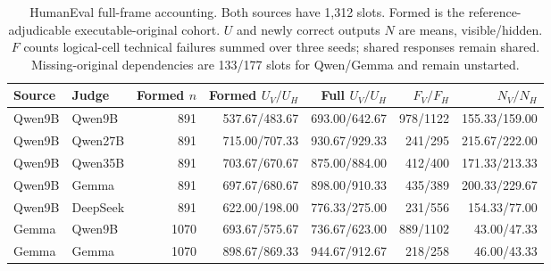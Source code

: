 \begin{table}[t]
\centering
\small
\caption{HumanEval full-frame accounting. Both sources have 1,312 slots. Formed is the reference-adjudicable executable-original cohort. $U$ and newly correct outputs $N$ are means, visible/hidden. $F$ counts logical-cell technical failures summed over three seeds; shared responses remain shared. Missing-original dependencies are 133/177 slots for Qwen/Gemma and remain unstarted.}
\label{tab:s_formation}
\begin{tabular}{llrrrrr}
\toprule
Source & Judge & Formed $n$ & Formed $U_V/U_H$ & Full $U_V/U_H$ & $F_V/F_H$ & $N_V/N_H$ \\
\midrule
Qwen9B & Qwen9B & 891 & 537.67/483.67 & 693.00/642.67 & 978/1122 & 155.33/159.00 \\
Qwen9B & Qwen27B & 891 & 715.00/707.33 & 930.67/929.33 & 241/295 & 215.67/222.00 \\
Qwen9B & Qwen35B & 891 & 703.67/670.67 & 875.00/884.00 & 412/400 & 171.33/213.33 \\
Qwen9B & Gemma & 891 & 697.67/680.67 & 898.00/910.33 & 435/389 & 200.33/229.67 \\
Qwen9B & DeepSeek & 891 & 622.00/198.00 & 776.33/275.00 & 231/556 & 154.33/77.00 \\
Gemma & Qwen9B & 1070 & 693.67/575.67 & 736.67/623.00 & 889/1102 & 43.00/47.33 \\
Gemma & Gemma & 1070 & 898.67/869.33 & 944.67/912.67 & 218/258 & 46.00/43.33 \\
\bottomrule
\end{tabular}
\end{table}
